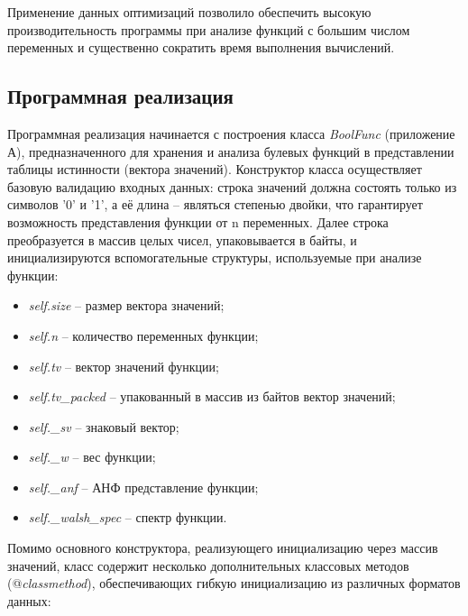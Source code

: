 Применение данных оптимизаций позволило обеспечить высокую производительность программы при анализе функций с большим числом переменных и существенно сократить время выполнения вычислений.
\subsection{Программная реализация}
Программная реализация начинается с построения класса \textit{BoolFunc} (приложение А), предназначенного для хранения и анализа булевых функций в представлении таблицы истинности (вектора значений). Конструктор класса осуществляет базовую валидацию входных данных: строка значений должна состоять только из символов '0' и '1', а её длина – являться степенью двойки, что гарантирует возможность представления функции от n переменных. Далее строка преобразуется в массив целых чисел, упаковывается в байты, и инициализируются вспомогательные структуры, используемые при анализе функции:
\begin{itemize}
    \item \textit{self.size} – размер вектора значений;
    \item \textit{self.n} – количество переменных функции;
    \item \textit{self.tv} – вектор значений функции;
    \item \textit{self.tv\_packed} – упакованный в массив из байтов вектор значений;
    \item \textit{self.\_sv} – знаковый вектор;
    \item \textit{self.\_w} – вес функции;
    \item \textit{self.\_anf} – АНФ представление функции;
    \item \textit{self.\_walsh\_spec} – спектр функции. 
\end{itemize}
Помимо основного конструктора, реализующего инициализацию через массив значений, класс содержит несколько дополнительных классовых методов (@\textit{classmethod}), обеспечивающих гибкую инициализацию из различных форматов данных:
